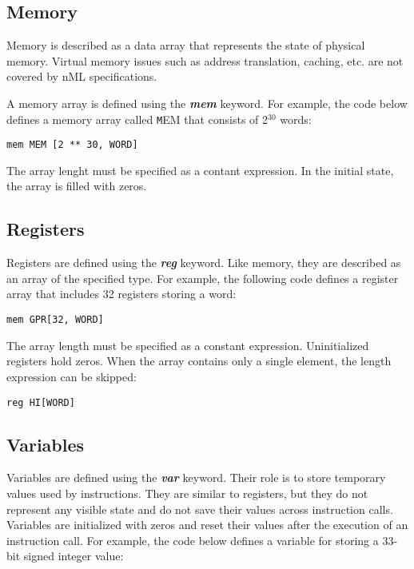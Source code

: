 \subsection{Memory}

Memory is described as a data array that represents the state of physical memory. Virtual memory
issues such as address translation, caching, etc. are not covered by nML specifications.

A memory array is defined using the \textbf{\textit{mem}} keyword. For example, the code below
defines a memory array called {\texttt MEM} that consists of 2$^{30}$ words:

\begin{lstlisting}
mem MEM [2 ** 30, WORD]
\end{lstlisting}

The array lenght must be specified as a contant expression. In the initial state, the array is
filled with zeros.

\subsection{Registers}

Registers are defined using the \textbf{\textit{reg}} keyword. Like memory, they are described
as an array of the specified type. For example, the following code defines a register array that
includes 32 registers storing a word:

\begin{lstlisting}
mem GPR[32, WORD]
\end{lstlisting}

The array length must be specified as a constant expression. Uninitialized registers hold
zeros. When the array contains only a single element, the length expression can be skipped:

\begin{lstlisting}
reg HI[WORD]
\end{lstlisting}

\subsection{Variables}

Variables are defined using the \textbf{\textit{var}} keyword. Their role is to store
temporary values used by instructions. They are similar to registers, but they do not represent
any visible state and do not save their values across instruction calls. Variables are initialized
with zeros and reset their values after the execution of an instruction call. For example, the code
below defines a variable for storing a 33-bit signed integer value:

